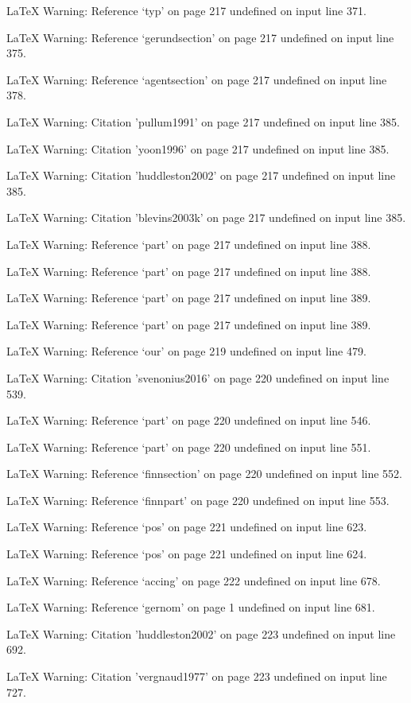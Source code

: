 LaTeX Warning: Reference `typ' on page 217 undefined on input line 371.


LaTeX Warning: Reference `gerundsection' on page 217 undefined on input line 375.


LaTeX Warning: Reference `agentsection' on page 217 undefined on input line 378.


LaTeX Warning: Citation 'pullum1991' on page 217 undefined on input line 385.


LaTeX Warning: Citation 'yoon1996' on page 217 undefined on input line 385.


LaTeX Warning: Citation 'huddleston2002' on page 217 undefined on input line 385.


LaTeX Warning: Citation 'blevins2003k' on page 217 undefined on input line 385.


LaTeX Warning: Reference `part' on page 217 undefined on input line 388.


LaTeX Warning: Reference `part' on page 217 undefined on input line 388.


LaTeX Warning: Reference `part' on page 217 undefined on input line 389.


LaTeX Warning: Reference `part' on page 217 undefined on input line 389.


LaTeX Warning: Reference `our' on page 219 undefined on input line 479.


LaTeX Warning: Citation 'svenonius2016' on page 220 undefined on input line 539.


LaTeX Warning: Reference `part' on page 220 undefined on input line 546.


LaTeX Warning: Reference `part' on page 220 undefined on input line 551.


LaTeX Warning: Reference `finnsection' on page 220 undefined on input line 552.


LaTeX Warning: Reference `finnpart' on page 220 undefined on input line 553.


LaTeX Warning: Reference `pos' on page 221 undefined on input line 623.


LaTeX Warning: Reference `pos' on page 221 undefined on input line 624.


LaTeX Warning: Reference `accing' on page 222 undefined on input line 678.


LaTeX Warning: Reference `gernom' on page 1 undefined on input line 681.


LaTeX Warning: Citation 'huddleston2002' on page 223 undefined on input line 692.


LaTeX Warning: Citation 'vergnaud1977' on page 223 undefined on input line 727.


